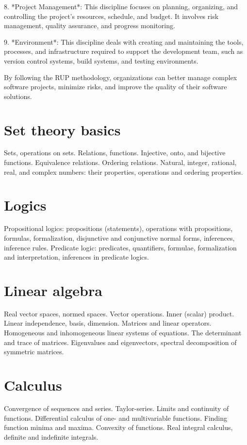 \documentclass{article}
\begin{document}
8. *Project Management*: This discipline focuses on planning, organizing, and controlling the project's resources, schedule, and budget. It involves risk management, quality assurance, and progress monitoring.

9. *Environment*: This discipline deals with creating and maintaining the tools, processes, and infrastructure required to support the development team, such as version control systems, build systems, and testing environments.

By following the RUP methodology, organizations can better manage complex software projects, minimize risks, and improve the quality of their software solutions.


\section{Set theory basics}

Sets, operations on sets. Relations, functions. Injective, onto, and bijective functions. Equivalence relations. Ordering relations. Natural, integer, rational, real, and complex numbers: their properties, operations and ordering properties.


\section{Logics}

Propositional logics: propositions (statements), operations with propositions, formulas, formalization, disjunctive and conjunctive normal forms, inferences, inference rules. Predicate logic: predicates, quantifiers, formulae, formalization and interpretation, inferences in predicate logics.


\section{Linear algebra}

Real vector spaces, normed spaces. Vector operations. Inner (scalar) product. Linear independence, basis, dimension. Matrices and linear operators. Homogeneous and inhomogeneous linear systems of equations. The determinant and trace of matrices. Eigenvalues and eigenvectors, spectral decomposition of symmetric matrices.


\section{Calculus}

Convergence of sequences and series. Taylor-series. Limits and continuity of functions. Differential calculus of one- and multivariable functions. Finding function minima and maxima. Convexity of functions. Real integral calculus, definite and indefinite integrals.
\end{document}

